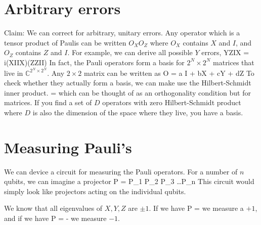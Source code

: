 \section{Arbitrary errors}
Claim: We can correct for arbitrary, unitary errors. Any operator which is a tensor product of Paulis can be written $O_XO_Z$ where $O_X$ contains $X$ and $I$, and $O_Z$ contains $Z$ and $I$. 
For example, we can derive all possible $Y$ errors, 
\beq
YZIX = i(XIIX)(ZZII)
\eeq
In fact, the Pauli operators form a basis for $2^N \times 2^N$ matrices that live in $\mathbb{C}^{2^N\times 2^N}$. Any $2\times2$ matrix can be written as
\beq
O = a I + bX + cY + dZ
\eeq
To check whether they actually form a basis, we can make use the Hilbert-Schmidt inner product. 
\beq
{} = 
\eeq
which can be thought of as an orthogonality condition but for matrices. If you find a set of $D$ operators with zero Hilbert-Schmidt product where $D$ is also the dimension of the space where they live, you have a basis. 

\section{Measuring Pauli's}
We can device a circuit for measuring the Pauli operators. For a number of $n$ qubits, we can imagine a projector
\beq
P = P_1 \otimes P_2 \otimes P_3 \otimes \ldots \otimes P_n
\eeq
This circuit would simply look like projectors acting on the individual qubits. 

We know that all eigenvalues of $X,Y,Z$ are $\pm 1$. If we have
\beq
P \ket{\psi} = \ket{\psi}
\eeq
we measure a $+1$, and if we have
\beq
P\ket{\psi} = - \ket{\psi}
\eeq
we measure $-1$. 

